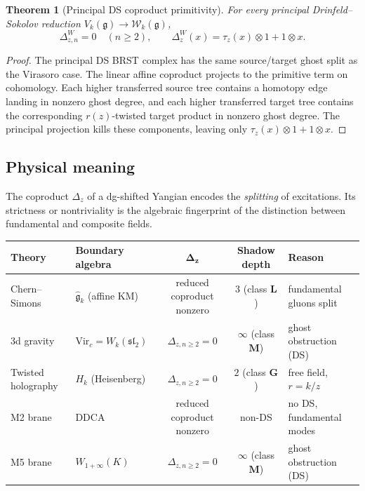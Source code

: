 \documentclass[11pt]{article}
\theoremstyle{plain}
\newtheorem{theorem}{Theorem}[section]
\theoremstyle{definition}
\theoremstyle{remark}
\providecommand{\fg}{\mathfrak{g}}
\providecommand{\cW}{\mathcal{W}}
\begin{document}
\begin{theorem}[Principal DS coproduct primitivity]
\label{thm:general-ds-primitivity}
For every principal Drinfeld--Sokolov reduction
$V_k(\fg)\to\cW_k(\fg)$,
\[
\Delta^W_{z,n}=0\quad(n\ge2),\qquad
\Delta^W_z(x)=\tau_z(x)\otimes 1+1\otimes x .
\]
\end{theorem}

\begin{proof}
The principal DS BRST complex has the same source/target ghost split
as the Virasoro case. The linear affine coproduct projects to the
primitive term on cohomology. Each higher transferred source tree
contains a homotopy edge landing in nonzero ghost degree, and each
higher transferred target tree contains the corresponding
$r(z)$-twisted target product in nonzero ghost degree. The principal
projection kills these components, leaving only
$\tau_z(x)\otimes1+1\otimes x$.
\end{proof}


\subsection{Physical meaning}
\label{subsec:physical-meaning}

The coproduct $\Delta_z$ of a dg-shifted Yangian encodes the
\emph{splitting} of excitations. Its strictness or nontriviality
is the algebraic fingerprint of the distinction between fundamental
and composite fields.

\begin{center}
\small
\renewcommand{\arraystretch}{1.3}
\begin{tabular}{llccl}
\textbf{Theory}
& \textbf{Boundary algebra}
& $\boldsymbol{\Delta_z}$
& \textbf{Shadow depth}
& \textbf{Reason} \\
\hline
Chern--Simons &
 $\hat{\mathfrak{g}}_k$ (affine KM) &
 reduced coproduct nonzero &
 $3$ (class $\mathbf{L}$) &
 fundamental gluons split \\[4pt]
3d gravity &
 $\mathrm{Vir}_c = W_k(\mathfrak{sl}_2)$ &
 $\Delta_{z,n\ge2}=0$ &
 $\infty$ (class $\mathbf{M}$) &
 ghost obstruction (DS) \\[4pt]
Twisted holography &
 $H_k$ (Heisenberg) &
 $\Delta_{z,n\ge2}=0$ &
 $2$ (class $\mathbf{G}$) &
 free field, $r = k/z$ \\[4pt]
M2 brane &
 DDCA &
 reduced coproduct nonzero &
 non-DS &
 no DS, fundamental modes \\[4pt]
M5 brane &
 $W_{1+\infty}(K)$ &
 $\Delta_{z,n\ge2}=0$ &
 $\infty$ (class $\mathbf{M}$) &
 ghost obstruction (DS) \\
\end{tabular}
\end{center}
\end{document}
